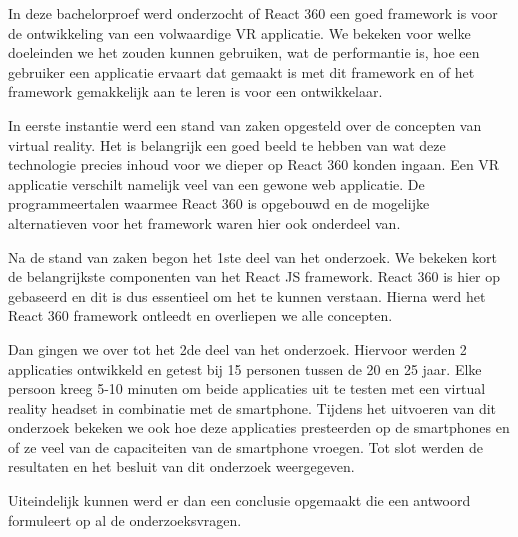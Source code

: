 In deze bachelorproef werd onderzocht of React 360 een goed framework is voor de ontwikkeling van een volwaardige VR applicatie. We bekeken voor welke doeleinden we het zouden kunnen gebruiken, wat de performantie is, hoe een gebruiker een applicatie ervaart dat gemaakt is met dit framework en of het framework gemakkelijk aan te leren is voor een ontwikkelaar.

In eerste instantie werd een stand van zaken opgesteld over de concepten van virtual reality. Het is belangrijk een goed beeld te hebben van wat deze technologie precies inhoud voor we dieper op React 360 konden ingaan. Een VR applicatie verschilt namelijk veel van een gewone web applicatie. De programmeertalen waarmee React 360 is opgebouwd en de mogelijke alternatieven voor het framework waren hier ook onderdeel van.

Na de stand van zaken begon het 1ste deel van het onderzoek. We bekeken kort de belangrijkste componenten van het React JS framework. React 360 is hier op gebaseerd en dit is dus essentieel om het te kunnen verstaan. Hierna werd het React 360 framework ontleedt en overliepen we alle concepten.

Dan gingen we over tot het 2de deel van het onderzoek. Hiervoor werden 2 applicaties ontwikkeld en getest bij 15 personen tussen de 20 en 25 jaar. Elke persoon kreeg 5-10 minuten om beide applicaties uit te testen met een virtual reality headset in combinatie met de smartphone. Tijdens het uitvoeren van dit onderzoek bekeken we ook hoe deze applicaties presteerden op de smartphones en of ze veel van de capaciteiten van de smartphone vroegen. Tot slot werden de resultaten en het besluit van dit onderzoek weergegeven.

Uiteindelijk kunnen werd er dan een conclusie opgemaakt die een antwoord formuleert op al de onderzoeksvragen.
